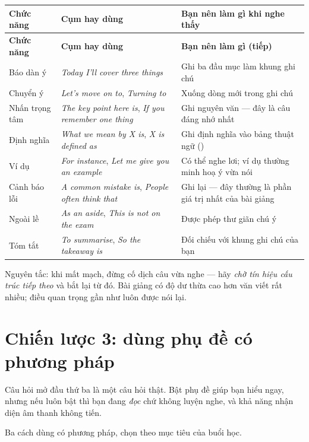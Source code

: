 \documentclass[../../english.tex]{subfiles}
\begin{document}
\begin{center}\footnotesize
{}
\begin{longtable}{@{}L{3.6cm}L{5.4cm}L{5.4cm}@{}}
\toprule
\textbf{Chức năng} & \textbf{Cụm hay dùng} & \textbf{Bạn nên làm gì khi nghe thấy}\\
\midrule
\endfirsthead
\toprule
\textbf{Chức năng} & \textbf{Cụm hay dùng} & \textbf{Bạn nên làm gì (tiếp)}\\
\midrule
\endhead
Báo dàn ý & \emph{Today I'll cover three things} & Ghi ba đầu mục làm khung ghi chú\\
Chuyển ý & \emph{Let's move on to}, \emph{Turning to} & Xuống dòng mới trong ghi chú\\
Nhấn trọng tâm & \emph{The key point here is}, \emph{If you remember one thing} & Ghi nguyên văn --- đây là câu đáng nhớ nhất\\
Định nghĩa & \emph{What we mean by X is}, \emph{X is defined as} & Ghi định nghĩa vào bảng thuật ngữ ()\\
Ví dụ & \emph{For instance}, \emph{Let me give you an example} & Có thể nghe lơi; ví dụ thường minh hoạ ý vừa nói\\
Cảnh báo lỗi & \emph{A common mistake is}, \emph{People often think that} & Ghi lại --- đây thường là phần giá trị nhất của bài giảng\\
Ngoài lề & \emph{As an aside}, \emph{This is not on the exam} & Được phép thư giãn chú ý\\
Tóm tắt & \emph{To summarise}, \emph{So the takeaway is} & Đối chiếu với khung ghi chú của bạn\\
\bottomrule
\end{longtable}
\end{center}

Nguyên tắc: khi mất mạch, đừng cố dịch câu vừa nghe --- hãy \emph{chờ tín hiệu cấu trúc tiếp theo} và bắt lại từ đó. Bài giảng có độ dư thừa cao hơn văn viết rất nhiều; điều quan trọng gần như luôn được nói lại.

\section{Chiến lược 3: dùng phụ đề có phương pháp}

Câu hỏi mở đầu thứ ba là một câu hỏi thật. Bật phụ đề giúp bạn hiểu ngay, nhưng nếu luôn bật thì bạn đang \emph{đọc} chứ không luyện nghe, và khả năng nhận diện âm thanh không tiến.

Ba cách dùng có phương pháp, chọn theo mục tiêu của buổi học.
\end{document}
